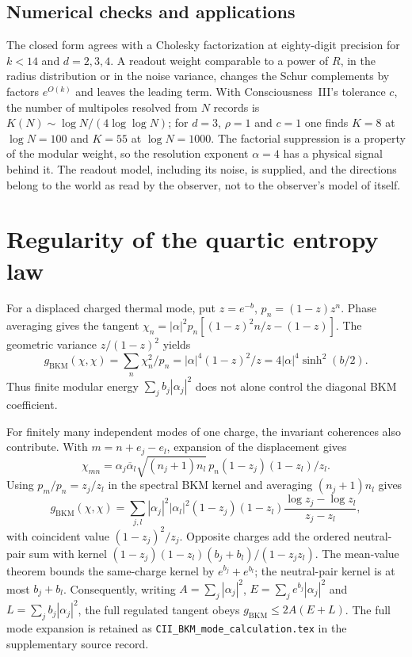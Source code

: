 \documentclass[12pt]{article}
\theoremstyle{definition}
\theoremstyle{remark}
\begin{document}
\subsection{Numerical checks and applications}
The closed form agrees with a Cholesky factorization at eighty-digit precision for
\(k<14\) and \(d=2,3,4\). A readout weight comparable to a power of \(R\), in
the radius distribution or in the noise variance, changes the Schur complements by factors
\(e^{O(k)}\) and leaves the leading term. With Consciousness~III's tolerance \(c\), the
number of multipoles resolved from \(N\) records is
\(K(N)\sim\log N/(4\log\log N)\); for \(d=3\), \(\rho=1\) and \(c=1\) one finds \(K=8\) at
\(\log N=100\) and \(K=55\) at \(\log N=1000\). The factorial suppression is a property of
the modular weight, so the resolution exponent \(\alpha=4\) has a physical signal behind it.
The readout model, including its noise, is supplied, and the directions belong to the world
as read by the observer, not to the observer's model of itself.

\section{Regularity of the quartic entropy law}\label{app:bkm}

For a displaced charged thermal mode, put $z=e^{-b}$,
$p_n=(1-z)z^n$. Phase averaging gives the tangent
$\chi_n=|\alpha|^2p_n[(1-z)^2n/z-(1-z)]$.
The geometric variance $z/(1-z)^2$ yields
\begin{equation}\label{eq:modebkm}
 g_{\mathrm{BKM}}(\chi,\chi)
 =\sum_n\chi_n^2/p_n
 =|\alpha|^4(1-z)^2/z
 =4|\alpha|^4\sinh^2(b/2).
\end{equation}
Thus finite modular energy $\sum_jb_j|\alpha_j|^2$ does not alone
control the diagonal BKM coefficient.

For finitely many independent modes of one charge, the invariant
coherences also contribute. With $m=n+e_j-e_l$, expansion of the
displacement gives
\[
 \chi_{mn}=\alpha_j\overline\alpha_l
 \sqrt{(n_j+1)n_l}\,p_n(1-z_j)(1-z_l)/z_l.
\]
Using $p_m/p_n=z_j/z_l$ in the spectral BKM kernel and averaging
$(n_j+1)n_l$ gives
\begin{equation}\label{eq:multimodebkm}
 g_{\mathrm{BKM}}(\chi,\chi)
 =\sum_{j,l}|\alpha_j|^2|\alpha_l|^2
 (1-z_j)(1-z_l)\frac{\log z_j-\log z_l}{z_j-z_l},
\end{equation}
with coincident value $(1-z_j)^2/z_j$.
Opposite charges add the ordered neutral-pair sum with kernel
$(1-z_j)(1-z_l)(b_j+b_l)/(1-z_jz_l)$.
The mean-value theorem bounds the same-charge kernel by
$e^{b_j}+e^{b_l}$; the neutral-pair kernel is at most $b_j+b_l$.
Consequently, writing
$A=\sum_j|\alpha_j|^2$, $E=\sum_je^{b_j}|\alpha_j|^2$ and
$L=\sum_jb_j|\alpha_j|^2$, the full regulated tangent obeys
$g_{\mathrm{BKM}}\le2A(E+L)$.
The full mode expansion is retained as
\nolinkurl{CII_BKM_mode_calculation.tex} in the supplementary source record.
\end{document}
